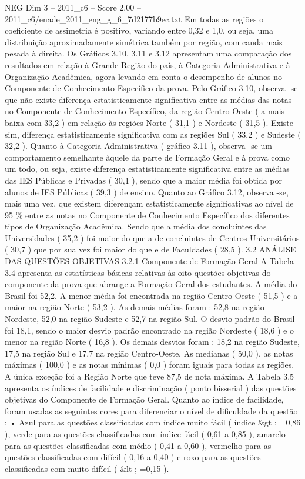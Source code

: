 \begin{textsample}{NEG Dim 3 – 2011\_c6 – Score 2.00 – 2011\_c6/enade\_2011\_eng\_g\_6\_7d2177b9ec.txt}
Em todas as regiões o coeficiente de assimetria é positivo, variando entre 0,32 e 1,0, ou seja, uma distribuição aproximadamente simétrica também por região, com cauda mais pesada à direita.
Os Gráficos 3.10, 3.11 e 3.12 apresentam uma comparação dos resultados em relação à Grande Região do país, à Categoria Administrativa e à Organização Acadêmica, agora levando em conta o desempenho de alunos no Componente de Conhecimento Específico da prova.
Pelo Gráfico 3.10, observa -se que não existe diferença estatisticamente significativa entre as médias das notas no Componente de Conhecimento Específico, da região Centro-Oeste ( a mais baixa com 33,2 ) em relação às regiões Norte ( 31,1 ) e Nordeste ( 31,5 ).
Existe sim, diferença estatisticamente significativa com as regiões Sul ( 33,2 ) e Sudeste ( 32,2 ).
Quanto à Categoria Administrativa ( gráfico 3.11 ), observa -se um comportamento semelhante àquele da parte de Formação Geral e à prova como um todo, ou seja, existe diferença estatisticamente significativa entre as médias das IES Públicas e Privadas ( 30,1 ), sendo que a maior média foi obtida por alunos de IES Públicas ( 39,3 ) de ensino.
Quanto ao Gráfico 3.12, observa -se, mais uma vez, que existem diferençam estatisticamente significativas ao nível de 95 \% entre as notas no Componente de Conhecimento Específico dos diferentes tipos de Organização Acadêmica.
Sendo que a média dos concluintes das Universidades ( 35,2 ) foi maior do que a de concluintes de Centros Universitários ( 30,7 ) que por sua vez foi maior do que e de Faculdades ( 28,5 ). 3.2 ANÁLISE DAS QUESTÕES OBJETIVAS 3.2.1 Componente de Formação Geral A Tabela 3.4 apresenta as estatísticas básicas relativas às oito questões objetivas do componente da prova que abrange a Formação Geral dos estudantes.
A média do Brasil foi 52,2.
A menor média foi encontrada na região Centro-Oeste ( 51,5 ) e a maior na região Norte ( 53,2 ).
As demais médias foram : 52,8 na região Nordeste, 52,0 na região Sudeste e 52,7 na região Sul.
O desvio padrão do Brasil foi 18,1, sendo o maior desvio padrão encontrado na região Nordeste ( 18,6 ) e o menor na região Norte ( 16,8 ).
Os demais desvios foram : 18,2 na região Sudeste, 17,5 na região Sul e 17,7 na região Centro-Oeste.
As medianas ( 50,0 ), as notas máximas ( 100,0 ) e as notas mínimas ( 0,0 ) foram iguais para todas as regiões.
A única exceção foi a Região Norte que teve 87,5 de nota máxima.
A Tabela 3.5 apresenta os índices de facilidade e discriminação ( ponto bisserial ) das questões objetivas do Componente de Formação Geral.
Quanto ao índice de facilidade, foram usadas as seguintes cores para diferenciar o nível de dificuldade da questão : • Azul para as questões classificadas com índice muito fácil ( índice \&gt ; =0,86 ), verde para as questões classificadas com índice fácil ( 0,61 a 0,85 ), amarelo para as questões classificadas com médio ( 0,41 a 0,60 ), vermelho para as questões classificadas com difícil ( 0,16 a 0,40 ) e roxo para as questões classificadas com muito difícil ( \&lt ; =0,15 ).

\end{textsample}
